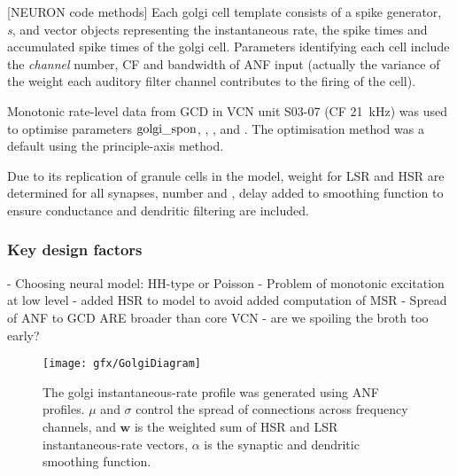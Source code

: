 \medskip{}

[NEURON code methods] Each golgi cell template consists of a spike generator, \emph{s}, and vector
objects representing the instantaneous rate, the spike times and
accumulated  spike times of the golgi cell. Parameters identifying
each cell include the \emph{channel} number, CF and bandwidth of ANF
input (actually the variance of the weight each auditory filter
channel contributes to the firing of the cell).


\vspace{1ex}



Monotonic rate-level data from GCD in VCN \citep{GhoshalKim:1996} unit
S03-07 (CF 21~kHz) was used to optimise parameters ${\rm
golgi\_spon}$, \wLSRGLG, \wHSRGLG, and \sANFGLG\@.  The optimisation
method was a default using the principle-axis method.
\medskip{}


Due to its replication of granule cells in the model, weight for LSR \wLSRGLG and HSR \wHSRGLG are determined for all synapses, number \nLSRDS and \nHSRDS, delay \dANFGLG added to smoothing function to ensure conductance and dendritic filtering are included.

\subsubsection{Key design factors}
 - Choosing neural model: HH-type or Poisson
 - Problem of monotonic excitation at low level
  - added HSR to model to avoid added computation of MSR
 - Spread of ANF to GCD ARE broader than core VCN
  - are we spoiling the broth too early? 


\begin{figure}[hp!]
  \centering
  \texttt{[image: gfx/GolgiDiagram]}
  \caption{ The golgi instantaneous-rate profile was generated using ANF
    profiles. $\mu$ and $\sigma$ control the spread of connections
    across frequency channels, and $\mathbf{w}$ is
    the weighted sum of HSR and LSR instantaneous-rate vectors,
    $\alpha$ is the synaptic and dendritic smoothing function.}
\end{figure}



